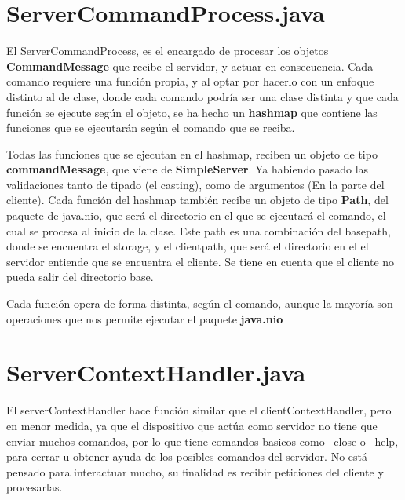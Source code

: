 \documentclass[a4paper, 12pt]{report}
\begin{document}
\section{ServerCommandProcess.java}

El ServerCommandProcess, es el encargado de procesar los objetos \textbf{CommandMessage} que recibe el
servidor, y actuar en consecuencia. Cada comando requiere una función propia, y al optar
por hacerlo con un enfoque distinto al de clase, donde cada comando podría ser una clase distinta y que cada
función se ejecute según el objeto, se ha hecho un \textbf{hashmap} que contiene las funciones que se ejecutarán
según el comando que se reciba.

Todas las funciones que se ejecutan en el hashmap, reciben un objeto de tipo \textbf{commandMessage},
que viene de \textbf{SimpleServer}. Ya habiendo pasado las validaciones tanto de tipado (el casting),
como de argumentos (En la parte del cliente). Cada función del hashmap también recibe un objeto de tipo
\textbf{Path}, del paquete de java.nio, que será el directorio en el que se ejecutará el comando, el cual se
procesa al inicio de la clase. Este path es una combinación del basepath, donde se encuentra el storage, y el
clientpath, que será el directorio en el el servidor entiende que se encuentra el cliente.
Se tiene en cuenta que el cliente no pueda salir del directorio base.

Cada función opera de forma distinta, según el comando, aunque la mayoría son operaciones que nos permite ejecutar el paquete \textbf{java.nio}

\section{ServerContextHandler.java}

El serverContextHandler hace función similar que el clientContextHandler, pero en menor medida, ya que el
dispositivo que actúa como servidor no tiene que enviar muchos comandos, por lo que tiene comandos basicos como
--close o --help, para cerrar u obtener ayuda de los posibles comandos del servidor. No está pensado para interactuar mucho, su finalidad es recibir peticiones del cliente y procesarlas.

\printbibliography
\end{document}

